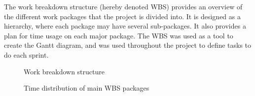 The work breakdown structure (hereby denoted WBS) provides an overview of the different work packages that the project is divided into. It is designed as a hierarchy, where each package may have several sub-packages. It also provides a plan for time usage on each major package. The WBS was used as a tool to create the Gantt diagram, and was used throughout the project to define tasks to do each sprint.

\begin{center}
  \begin{figure}[ht!]
    \caption{Work breakdown structure}
    \label{fig:Work breakdown structure}
  \end{figure}
\end{center}

\begin{center}
  \begin{figure}[ht!]
    \caption{Time distribution of main WBS packages}
    \label{fig:Main structure diagram}
  \end{figure}
\end{center}

